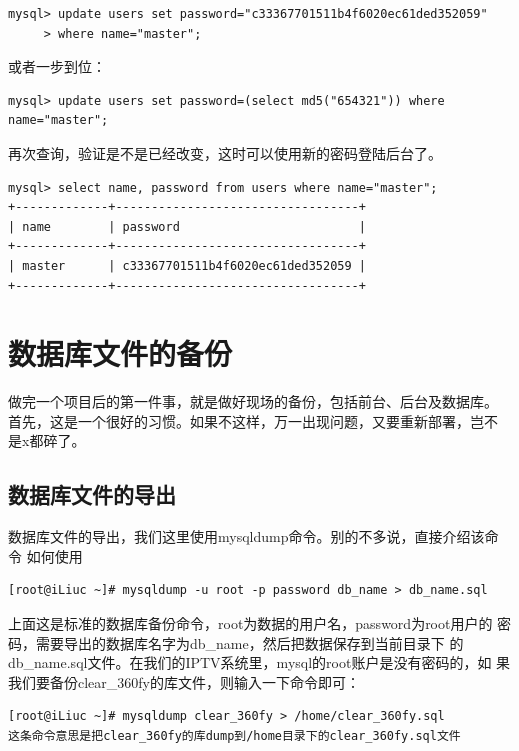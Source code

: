 \small{
\begin{verbatim}
mysql> update users set password="c33367701511b4f6020ec61ded352059" 
     > where name="master";
\end{verbatim}
}
\normalsize

或者一步到位：

\small{
\begin{verbatim}
mysql> update users set password=(select md5("654321")) where name="master";
\end{verbatim}
}
\normalsize

再次查询，验证是不是已经改变，这时可以使用新的密码登陆后台了。

\small{
\begin{verbatim}
mysql> select name, password from users where name="master";
+-------------+----------------------------------+
| name        | password                         |
+-------------+----------------------------------+
| master      | c33367701511b4f6020ec61ded352059 | 
+-------------+----------------------------------+
\end{verbatim}
}
\normalsize

\section{数据库文件的备份}

做完一个项目后的第一件事，就是做好现场的备份，包括前台、后台及数据库。
首先，这是一个很好的习惯。如果不这样，万一出现问题，又要重新部署，岂不
是x都碎了。

\subsection{数据库文件的导出}
\label{sec:exportData}

数据库文件的导出，我们这里使用mysqldump命令。别的不多说，直接介绍该命令
如何使用

\begin{verbatim}
[root@iLiuc ~]# mysqldump -u root -p password db_name > db_name.sql
\end{verbatim}

上面这是标准的数据库备份命令，root为数据的用户名，password为root用户的
密码，需要导出的数据库名字为db\_name，然后把数据保存到当前目录下
的db\_name.sql文件。在我们的IPTV系统里，mysql的root账户是没有密码的，如
果我们要备份clear\_360fy的库文件，则输入一下命令即可：

\small{
\begin{verbatim}
[root@iLiuc ~]# mysqldump clear_360fy > /home/clear_360fy.sql
这条命令意思是把clear_360fy的库dump到/home目录下的clear_360fy.sql文件
\end{verbatim}
}
\normalsize

